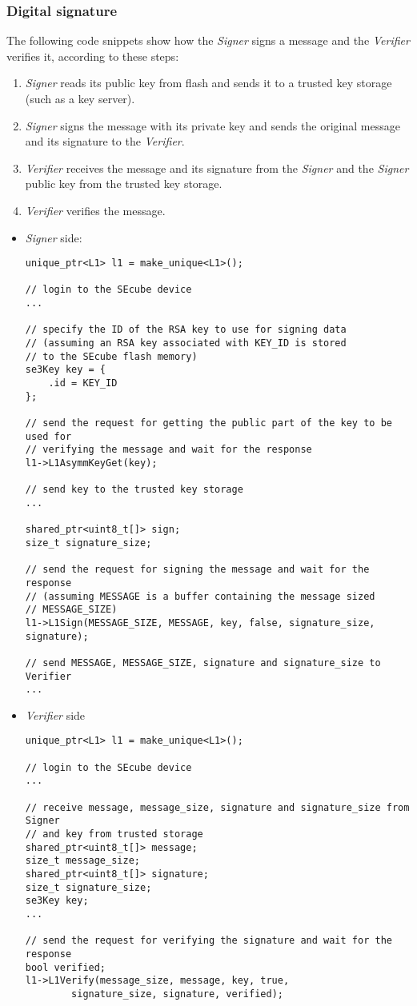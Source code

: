 \subsubsection{Digital signature}
The following code snippets show how the \emph{Signer} signs a message and the
\emph{Verifier} verifies it, according to these steps:
\begin{enumerate}
	\item \emph{Signer} reads its public key from flash and sends it to
		a trusted key storage (such as a key server).
	\item \emph{Signer} signs the message with its private key and sends
		the original message and its signature to the \emph{Verifier}.
	\item \emph{Verifier} receives the message and its signature from the
		\emph{Signer} and the \emph{Signer} public key from the trusted
		key storage.
	\item \emph{Verifier} verifies the message.
\end{enumerate}

\bigskip
\begin{itemize}
	\item \emph{Signer} side:
\begin{lstlisting}
unique_ptr<L1> l1 = make_unique<L1>();

// login to the SEcube device
...

// specify the ID of the RSA key to use for signing data
// (assuming an RSA key associated with KEY_ID is stored
// to the SEcube flash memory)
se3Key key = {
	.id = KEY_ID
};

// send the request for getting the public part of the key to be used for
// verifying the message and wait for the response
l1->L1AsymmKeyGet(key);

// send key to the trusted key storage
...

shared_ptr<uint8_t[]> sign;
size_t signature_size;

// send the request for signing the message and wait for the response
// (assuming MESSAGE is a buffer containing the message sized
// MESSAGE_SIZE)
l1->L1Sign(MESSAGE_SIZE, MESSAGE, key, false, signature_size, signature);

// send MESSAGE, MESSAGE_SIZE, signature and signature_size to Verifier
...
\end{lstlisting}
	\item \emph{Verifier} side
\begin{lstlisting}
unique_ptr<L1> l1 = make_unique<L1>();

// login to the SEcube device
...

// receive message, message_size, signature and signature_size from Signer
// and key from trusted storage
shared_ptr<uint8_t[]> message;
size_t message_size;
shared_ptr<uint8_t[]> signature;
size_t signature_size;
se3Key key;
...

// send the request for verifying the signature and wait for the response
bool verified;
l1->L1Verify(message_size, message, key, true,
		signature_size, signature, verified);
\end{lstlisting}
\end{itemize}

